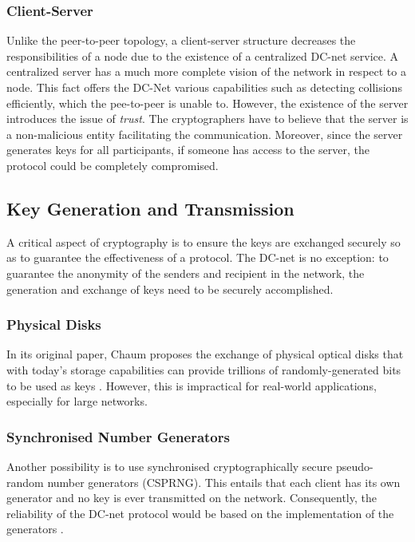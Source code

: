 \subsubsection{Client-Server} \label{sec:clientserver}
Unlike the peer-to-peer topology, a client-server structure decreases the responsibilities of a node due to the existence of a centralized DC-net service. A centralized server has a much more complete vision of the network in respect to a node. This fact offers the DC-Net various capabilities such as detecting collisions efficiently, which the pee-to-peer is unable to. However, the existence of the server introduces the issue of \emph{trust}. The cryptographers have to believe that the server is a non-malicious entity facilitating the communication. Moreover, since the server generates keys for all participants, if someone has access to the server, the protocol could be completely compromised.


\subsection{Key Generation and Transmission} \label{sec:keyExchangeMethods}
A critical aspect of cryptography is to ensure the keys are exchanged securely so as to guarantee the effectiveness of a protocol. The DC-net is no exception: to guarantee the anonymity of the senders and recipient in the network, the generation and exchange of keys need to be securely accomplished.

\subsubsection{Physical Disks}
In its original paper, Chaum proposes the exchange of physical optical disks that with today's storage capabilities can provide trillions of randomly-generated bits to be used as keys \cite{Chaum}. However, this is impractical for real-world applications, especially for large networks. 

\subsubsection{Synchronised Number Generators}
Another possibility is to use synchronised cryptographically secure pseudo-random number generators (CSPRNG). This entails that each client has its own generator and no key is ever transmitted on the network. Consequently, the reliability of the DC-net protocol would be based on the implementation of the generators \cite{Chaum}.


